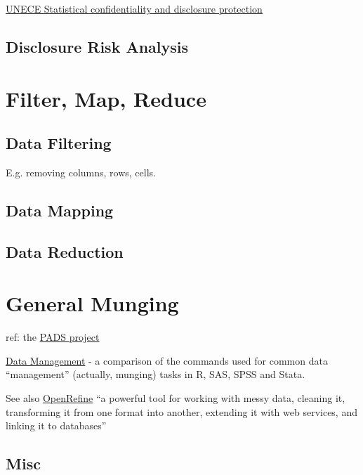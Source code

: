 \href{http://www.unece.org/stats/confidentiality.html}{UNECE Statistical confidentiality and disclosure protection}

\section{Disclosure Risk Analysis}

\chapter{Filter, Map, Reduce}
\label{filtermapreduce}

\section{Data Filtering}
\label{sect:datafiltering}

E.g. removing columns, rows, cells.

\section{Data Mapping}
\label{sect:datamapping}

\section{Data Reduction}
\label{sect:datareduction}


\chapter{General Munging}

ref:  the \href{http://www.padsproj.org/index.html}{PADS project}

\href{http://r4stats.com/examples/data-management/}{Data Management} - a comparison of the commands used for common data ``management'' (actually, munging) tasks in R, SAS, SPSS and Stata.

See also \href{http://openrefine.org/}{OpenRefine} ``a powerful tool for working with messy data, cleaning it, transforming it from one format into another, extending it with web services, and linking it to databases''

\section{Misc}


